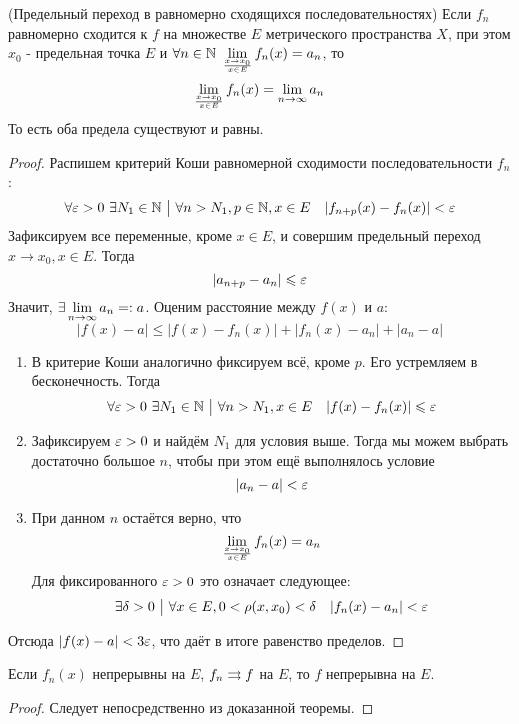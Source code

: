 \begin{theorem} (Предельный переход в равномерно сходящихся последовательностях)
	Если $f_n$ равномерно сходится к $f$ на множестве $E$ метрического пространства $X$, при этом $x_0$ - предельная точка $E$ и $\forall n \in \mathbb{N}\ \lim\limits_{x \to x_0 \over x \in E} f_n(x) = a_n$, то
	\[
		\lim\limits_{x \to x_0 \over x \in E} f_n(x) = \lim\limits_{n \to \infty} a_n
	\]
	То есть оба предела существуют и равны.
\end{theorem}

\begin{proof}
	Распишем критерий Коши равномерной сходимости последовательности $f_n$:
	\[
		\forall \varepsilon > 0\ \exists N_1 \in \mathbb{N} \ \big|\  \forall n > N_1, p \in \mathbb{N}, x \in E \quad |f_{n + p}(x) - f_n(x)| < \varepsilon
	\]
	Зафиксируем все переменные, кроме $x \in E$, и совершим предельный переход $x \to x_0, x \in E$. Тогда
	\[
		|a_{n + p} - a_n| \leqslant \varepsilon
	\]
	Значит, $\exists \lim\limits_{n \to \infty} a_n =: a$. Оценим расстояние между $f(x)$ и $a$:
	\[
		|f(x) - a| \le |f(x) - f_n(x)| + |f_n(x) - a_n| + |a_n - a|
	\]
	\begin{enumerate}
		\item В критерие Коши аналогично фиксируем всё, кроме $p$. Его устремляем в бесконечность. Тогда
		\[
			\forall \varepsilon > 0\ \exists N_1 \in \mathbb{N} \ \big|\  \forall n > N_1, x \in E \quad |f(x) - f_n(x)| \leqslant \varepsilon
		\]
		
		\item Зафиксируем $\varepsilon > 0$ и найдём $N_1$ для условия выше. Тогда мы можем выбрать достаточно большое $n$, чтобы при этом ещё выполнялось условие
		\[
			|a_n - a| < \varepsilon
		\]
		
		\item При данном $n$ остаётся верно, что
		\[
			\lim\limits_{x \to x_0 \over x \in E} f_n(x) = a_n
		\]
		Для фиксированного $\varepsilon > 0$ это означает следующее:
		\[
			\exists \delta > 0 \ \big|\  \forall x \in E, 0 < \rho(x, x_0) < \delta \quad |f_n(x) - a_n| < \varepsilon
		\]
	\end{enumerate}
	Отсюда $|f(x) - a| < 3\varepsilon$, что даёт в итоге равенство пределов.
\end{proof}

\begin{corollary}
	Если $f_n(x)$ непрерывны на $E$, $f_n \rightrightarrows f$ на $E$, то $f$ непрерывна на $E$.
\end{corollary}

\begin{proof}
	Следует непосредственно из доказанной теоремы.
\end{proof}

